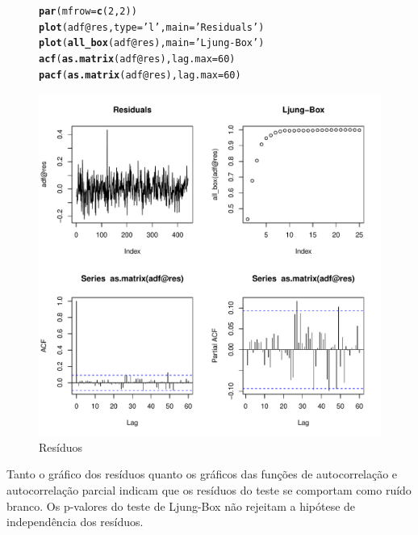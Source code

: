 \documentclass{article}\usepackage[]{graphicx}\usepackage[]{color}
\makeatletter
\def\maxwidth{ %
  \ifdim\Gin@nat@width>\linewidth
    \linewidth
  \else
    \Gin@nat@width
  \fi
}
\newcommand{\hlnum}[1]{\textcolor[rgb]{0.686,0.059,0.569}{#1}}%
\newcommand{\hlstr}[1]{\textcolor[rgb]{0.192,0.494,0.8}{#1}}%
\newcommand{\hlopt}[1]{\textcolor[rgb]{0,0,0}{#1}}%
\newcommand{\hlstd}[1]{\textcolor[rgb]{0.345,0.345,0.345}{#1}}%
\newcommand{\hlkwc}[1]{\textcolor[rgb]{0.333,0.667,0.333}{#1}}%
\newcommand{\hlkwd}[1]{\textcolor[rgb]{0.737,0.353,0.396}{\textbf{#1}}}%
\newenvironment{kframe}{%
 \def\at@end@of@kframe{}%
 \ifinner\ifhmode%
  \def\at@end@of@kframe{\end{minipage}}%
  \begin{minipage}{\columnwidth}%
 \fi\fi%
 \def\FrameCommand##1{\hskip\@totalleftmargin \hskip-\fboxsep
 \colorbox{shadecolor}{##1}\hskip-\fboxsep
     \hskip-\linewidth \hskip-\@totalleftmargin \hskip\columnwidth}%
 \MakeFramed {\advance\hsize-\width
   \@totalleftmargin\z@ \linewidth\hsize
   \@setminipage}}%
 {\par\unskip\endMakeFramed%
 \at@end@of@kframe}
\newenvironment{knitrout}{}{} %
\makeatother
\begin{document}
            \begin{figure}[H]
            \caption{Resíduos}
            \centering
\begin{knitrout}
\color{fgcolor}\begin{kframe}
\begin{alltt}
\hlkwd{par}\hlstd{(}\hlkwc{mfrow} \hlstd{=} \hlkwd{c}\hlstd{(}\hlnum{2}\hlstd{,}\hlnum{2}\hlstd{))}
\hlkwd{plot}\hlstd{(adf}\hlopt{@}\hlkwc{res}\hlstd{,} \hlkwc{type}\hlstd{=}\hlstr{'l'}\hlstd{,} \hlkwc{main}\hlstd{=}\hlstr{'Residuals'}\hlstd{)}
\hlkwd{plot}\hlstd{(}\hlkwd{all_box}\hlstd{(adf}\hlopt{@}\hlkwc{res}\hlstd{),} \hlkwc{main}\hlstd{=}\hlstr{'Ljung-Box'}\hlstd{)}
\hlkwd{acf}\hlstd{(}\hlkwd{as.matrix}\hlstd{(adf}\hlopt{@}\hlkwc{res}\hlstd{),} \hlkwc{lag.max}\hlstd{=}\hlnum{60}\hlstd{)}
\hlkwd{pacf}\hlstd{(}\hlkwd{as.matrix}\hlstd{(adf}\hlopt{@}\hlkwc{res}\hlstd{),} \hlkwc{lag.max}\hlstd{=}\hlnum{60}\hlstd{)}
\end{alltt}
\end{kframe}
\includegraphics[width=\maxwidth]{figure/unnamed-chunk-34-1} 

\end{knitrout}
            \end{figure}

            Tanto o gráfico dos resíduos quanto os gráficos das funções de autocorrelação e autocorrelação parcial indicam que os resíduos do teste se comportam como ruído branco. Os p-valores do teste de Ljung-Box não rejeitam a hipótese de independência dos resíduos.
\end{document}
